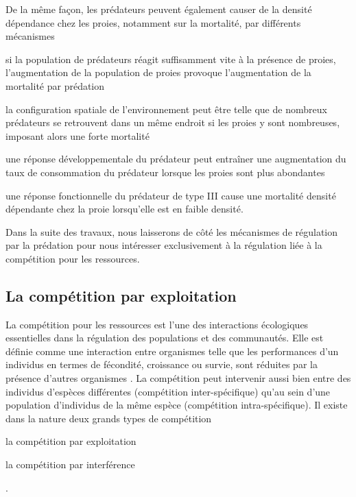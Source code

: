 De la même façon, les prédateurs peuvent également causer de la densité
dépendance chez les proies, notamment sur la mortalité, par différents
mécanismes \autocites{taylor1984a} 
\begin{enumerate*}[label=(\roman*),
before=\unskip{ : }, itemjoin={{ ; }}, itemjoin*={{ ; et }}] 
\item si la
population de prédateurs réagit suffisamment vite à la présence de proies,
l'augmentation de la population de proies provoque l'augmentation de la
mortalité par prédation 
\item la configuration spatiale de l'environnement peut être telle
que de nombreux prédateurs se retrouvent dans un même endroit si les proies y
sont nombreuses, imposant alors une forte mortalité 
\item une réponse
développementale du prédateur peut entraîner une augmentation du taux de
consommation du prédateur lorsque les proies sont plus abondantes 
\item une réponse fonctionnelle du prédateur de type III
\autocites{holling1965a} cause une mortalité densité dépendante chez la proie lorsqu'elle est en faible
densité.
\end{enumerate*}

Dans la suite des travaux, nous laisserons de côté les mécanismes de régulation
par la prédation pour nous intéresser exclusivement à la régulation liée à la
compétition pour les ressources. 

\subsection{La compétition par exploitation}

La compétition pour les ressources est l'une des interactions écologiques
essentielles dans la régulation des populations et des communautés. Elle est définie comme une
interaction entre organismes telle que les performances d'un individus en termes
de fécondité, croissance ou survie, sont réduites par la présence d'autres
organismes \autocites{volterra1931a, gause1932a, park1948a, park1954a,
park1957a}.
La compétition peut intervenir aussi bien entre des individus d'espèces
différentes (compétition inter-spécifique) qu'au sein d'une population
d'individus de la même espèce (compétition intra-spécifique). 
Il existe dans la nature deux grands types de compétition
\begin{enumerate*}[label=(\roman*), before=\unskip{ : }, itemjoin={{ ; }},
itemjoin*={{ ; et }}] \item la compétition par exploitation \item la compétition
par interférence \end{enumerate*} \autocites{park1954a, park1962a, begon2009a}.

